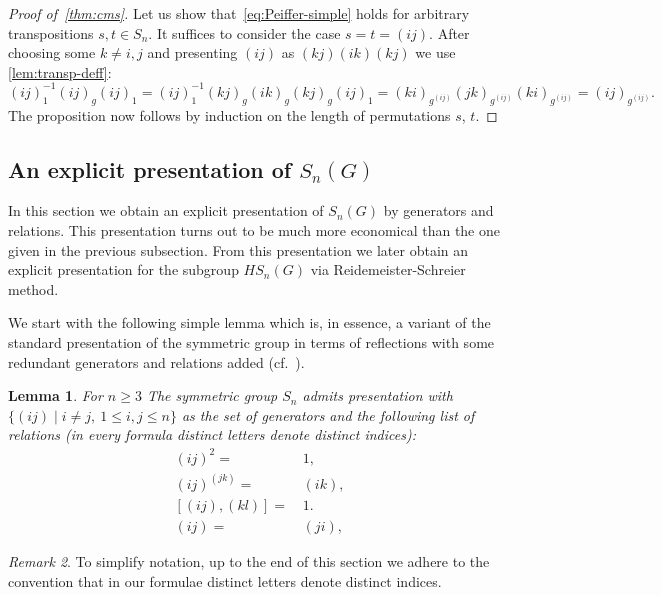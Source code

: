 \documentclass[oneside, 10pt]{amsart}
\theoremstyle{plain}
\numberwithin{equation}{section}
\newtheorem{lemma}{Lemma}
\numberwithin{lemma}{section}
\theoremstyle{remark}
\newtheorem{rem}[lemma]{Remark}
\theoremstyle{definition}
\begin{document}
\begin{proof}[Proof of~\cref{thm:cms}]
Let us show that~\eqref{eq:Peiffer-simple} holds for arbitrary transpositions $s, t \in S_n$.
It suffices to consider the case $s=t=(ij)$. 
After choosing some $k\neq i,j$ and presenting $(ij)$ as $(kj)(ik)(kj)$ we use \cref{lem:transp-deff}:
\begin{equation} \nonumber (ij)^{-1}_1 (ij)_g (ij)_1 = (ij)^{-1}_1 (kj)_g (ik)_g (kj)_g (ij)_1 =
(ki)_{g^{(ij)}} (jk)_{g^{(ij)}} (ki)_{g^{(ij)}} = (ij)_{g^{(ij)}}. \end{equation}
The proposition now follows by induction on the length of permutations $s$, $t$.
\end{proof}

\subsection{An explicit presentation of $S_n(G)$}
In this section we obtain an explicit presentation of $S_n(G)$ by generators and relations.
This presentation turns out to be much more economical than the one given in the previous subsection.
From this presentation we later obtain an explicit presentation for the subgroup $HS_n(G)$ via Reidemeister-Schreier method.

We start with the following simple lemma which is, in essence, a variant of the standard presentation of the symmetric group in terms of reflections
 with some redundant generators and relations added (cf.~\cite[Theorem~2.4.3]{Ca89}).
\begin{lemma} \label{lm:Snpres} For $n\geq 3$ The symmetric group $S_n$ admits presentation with 
$\{(ij) \mid i\neq j,\ 1\leq i,j\leq n\}$ as the set of generators and the following list of relations
 (in every formula distinct letters denote distinct indices):
\begin{align}
(ij)^2 = &\, 1,         \label{Sym1} \\
(ij)^{(jk)} = &\, (ik), \label{Sym2} \\
[(ij), (kl)] = &\,1.    \label{Sym3} \\
(ij) =&\, (ji),         \label{Sym0}
\end{align}
\end{lemma}
\begin{rem}
To simplify notation, up to the end of this section we adhere to the convention that in our formulae distinct letters denote distinct indices.
\end{rem}
\end{document}

